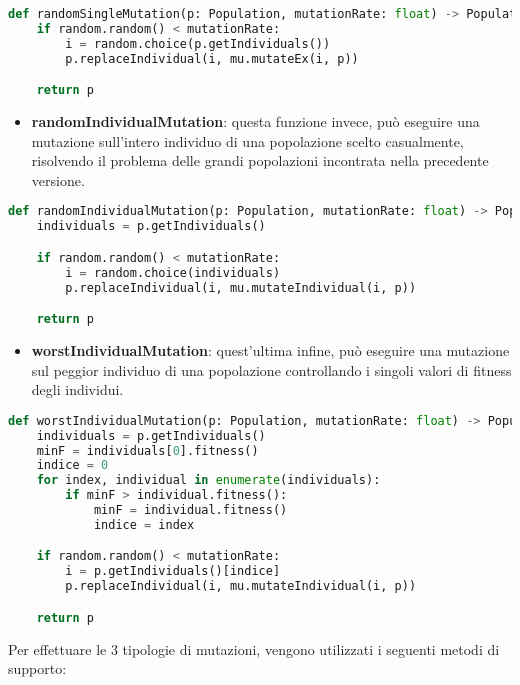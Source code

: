\documentclass{article}
\begin{document}
\begin{lstlisting}[language=Python]
def randomSingleMutation(p: Population, mutationRate: float) -> Population:
    if random.random() < mutationRate:
        i = random.choice(p.getIndividuals())
        p.replaceIndividual(i, mu.mutateEx(i, p))

    return p
\end{lstlisting}

\begin{itemize}
\item\textbf{randomIndividualMutation}: questa funzione invece, può eseguire una mutazione sull'intero individuo di una popolazione scelto casualmente, risolvendo il problema delle grandi popolazioni incontrata nella precedente versione.
\end{itemize}

\begin{lstlisting}[language=Python]
def randomIndividualMutation(p: Population, mutationRate: float) -> Population:
    individuals = p.getIndividuals()

    if random.random() < mutationRate:
        i = random.choice(individuals)
        p.replaceIndividual(i, mu.mutateIndividual(i, p))

    return p
\end{lstlisting}


\begin{itemize}
\item\textbf{worstIndividualMutation}: quest'ultima infine, può eseguire una mutazione sul peggior individuo di una popolazione controllando i singoli valori di fitness degli individui.
\end{itemize}

\begin{lstlisting}[language=Python]
def worstIndividualMutation(p: Population, mutationRate: float) -> Population:
    individuals = p.getIndividuals()
    minF = individuals[0].fitness()
    indice = 0
    for index, individual in enumerate(individuals):
        if minF > individual.fitness():
            minF = individual.fitness()
            indice = index

    if random.random() < mutationRate:
        i = p.getIndividuals()[indice]
        p.replaceIndividual(i, mu.mutateIndividual(i, p))

    return p
        \end{lstlisting}
        
\pagebreak

Per effettuare le 3 tipologie di mutazioni, vengono utilizzati i seguenti metodi di supporto:
\end{document}
